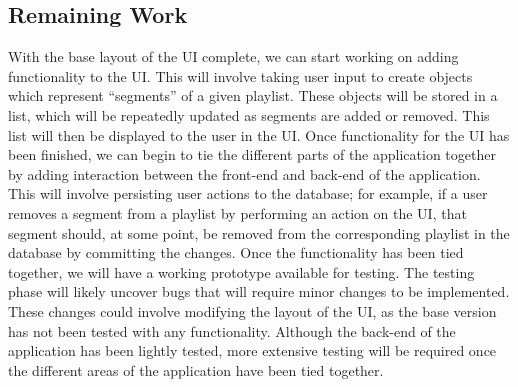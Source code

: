 \documentclass{article}
\begin{document}
\subsection{Remaining Work}
With the base layout of the UI complete, we can start working on adding functionality to the UI. This will involve taking user input to create objects which represent ``segments'' of a given playlist. These objects will be stored in a list, which will be repeatedly updated as segments are added or removed. This list will then be displayed to the user in the UI. Once functionality for the UI has been finished, we can begin to tie the different parts of the application together by adding interaction between the front-end and back-end of the application. This will involve persisting user actions to the database; for example, if a user removes a segment from a playlist by performing an action on the UI, that segment should, at some point, be removed from the corresponding playlist in the database by committing the changes. Once the functionality has been tied together, we will have a working prototype available for testing. The testing phase will likely uncover bugs that will require minor changes to be implemented. These changes could involve modifying the layout of the UI, as the base version has not been tested with any functionality. Although the back-end of the application has been lightly tested, more extensive testing will be required once the different areas of the application have been tied together.
\end{document}
